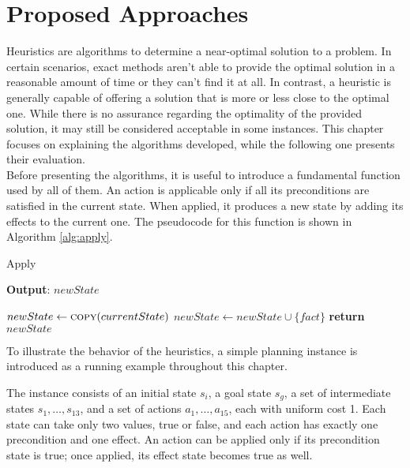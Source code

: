 \chapter{Proposed Approaches}
\label{ch:heuristics}
Heuristics are algorithms to determine a near-optimal solution to a problem. In certain scenarios,
exact methods aren't able to provide the optimal solution in a reasonable amount of time or they can't find it
at all. In contrast, a heuristic is generally capable of offering a solution that is more or less close to
the optimal one.
While there is no assurance regarding the optimality of the provided solution, it may still be considered
acceptable in some instances.
This chapter focuses on explaining the algorithms developed, while the following one presents their evaluation.\\
Before presenting the algorithms, it is useful to introduce a fundamental function used by all of them.
An action is applicable only if all its preconditions are satisfied in the current state.
When applied, it produces a new state by adding its effects to the current one.
The pseudocode for this function is shown in Algorithm \ref{alg:apply}.

\begin{algorithm}
	\caption{Apply}
	\label{alg:apply}
	\hspace*{0.5em} \textbf{Output}: $newState$
	\begin{algorithmic}[1]
		\State $newState \gets \Call{copy}{currentState}$
		\State $newState \gets newState \cup \{fact\}$
		\EndIf
		\EndFor
		\State \textbf{return} $newState$
		\EndProcedure
	\end{algorithmic}
\end{algorithm}

To illustrate the behavior of the heuristics, a simple planning instance is introduced
as a running example throughout this chapter.

\begin{definition}
	The instance consists of an initial state $s_i$, a goal state $s_g$, a set of intermediate states $s_1, \dots, s_{13}$,
	and a set of actions $a_1, \dots, a_{15}$, each with uniform cost 1.
	Each state can take only two values, true or false, and each action has exactly one precondition and one effect.
	An action can be applied only if its precondition state is true; once applied, its effect state becomes true as well.
\end{definition}

